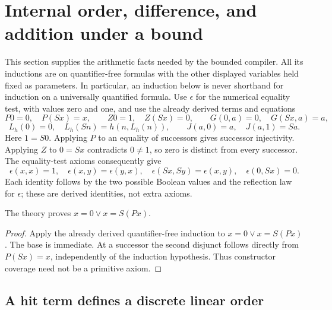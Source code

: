 
\section{Internal order, difference, and addition under a bound}
\label{sec:internal-order-foundations}

This section supplies the arithmetic facts needed by the bounded compiler.
All its inductions are on quantifier-free formulas with the other displayed
variables held fixed as parameters.  In particular, an induction below is
never shorthand for induction on a universally quantified formula.  Use $\epsilon$ for the numerical equality test, with values zero and one, and use
the already derived terms and equations
\[
 P0=0,\quad P(Sx)=x,\qquad Z0=1,\quad Z(Sx)=0,
 \qquad G(0,a)=0,\quad G(Sx,a)=a,
\]
\[
 L_h(0)=0,\quad L_h(Sn)=h(n,L_h(n)),\qquad
 J(a,0)=a,\quad J(a,1)=Sa.
\]
Here $1=S0$.  Applying $P$ to an equality of successors gives successor
injectivity.  Applying $Z$ to $0=Sx$ contradicts $0\ne1$, so zero is
distinct from every successor.  The equality-test axioms consequently give
\[
 \epsilon(x,x)=1,\quad \epsilon(x,y)=\epsilon(y,x),\quad
 \epsilon(Sx,Sy)=\epsilon(x,y),\quad \epsilon(0,Sx)=0.
\]
Each identity follows by the two possible Boolean values and the reflection
law for $\epsilon$; these are derived identities, not extra axioms.

\begin{lemma}
\label{lem:internal-coverage}
The theory proves $x=0\lor x=S(Px)$.
\end{lemma}
\begin{proof}
Apply the already derived quantifier-free induction to
$x=0\lor x=S(Px)$.  The base is immediate.  At a successor the second
disjunct follows directly from $P(Sx)=x$, independently of the induction
hypothesis.  Thus constructor coverage need not be a primitive axiom.
\end{proof}

\subsection{A hit term defines a discrete linear order}

